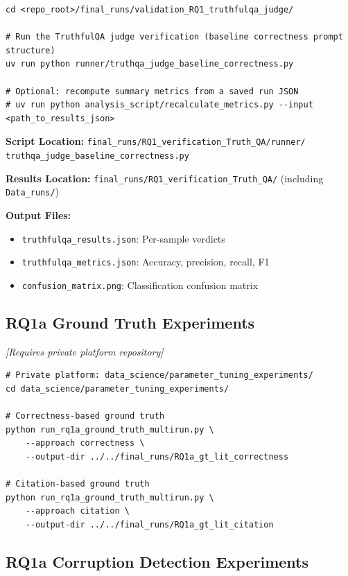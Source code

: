 \begin{verbatim}
cd <repo_root>/final_runs/validation_RQ1_truthfulqa_judge/

# Run the TruthfulQA judge verification (baseline correctness prompt structure)
uv run python runner/truthqa_judge_baseline_correctness.py

# Optional: recompute summary metrics from a saved run JSON
# uv run python analysis_script/recalculate_metrics.py --input <path_to_results_json>
\end{verbatim}

\textbf{Script Location:} \texttt{final\_runs/RQ1\_verification\_Truth\_QA/runner/} \texttt{truthqa\_judge\_baseline\_correctness.py}

\textbf{Results Location:} \texttt{final\_runs/RQ1\_verification\_Truth\_QA/} (including \texttt{Data\_runs/})

\textbf{Output Files:}
\begin{itemize}[noitemsep]
    \item \texttt{truthfulqa\_results.json}: Per-sample verdicts
    \item \texttt{truthfulqa\_metrics.json}: Accuracy, precision, recall, F1
    \item \texttt{confusion\_matrix.png}: Classification confusion matrix
\end{itemize}

\subsection{RQ1a Ground Truth Experiments}
\label{sec:rq1a_execution}

\noindent\textit{[Requires private platform repository]}

\begin{verbatim}
# Private platform: data_science/parameter_tuning_experiments/
cd data_science/parameter_tuning_experiments/

# Correctness-based ground truth
python run_rq1a_ground_truth_multirun.py \
    --approach correctness \
    --output-dir ../../final_runs/RQ1a_gt_lit_correctness

# Citation-based ground truth
python run_rq1a_ground_truth_multirun.py \
    --approach citation \
    --output-dir ../../final_runs/RQ1a_gt_lit_citation
\end{verbatim}

\subsection{RQ1a Corruption Detection Experiments}

